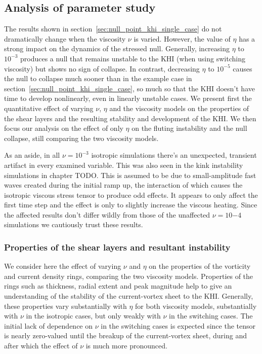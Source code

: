 
\subsection{Analysis of parameter study}

The results shown in section~\ref{sec:null_point_khi_single_case} do not dramatically change when the viscosity $\nu$ is varied. However, the value of $\eta$ has a strong impact on the dynamics of the stressed null. Generally, increasing $\eta$ to $10^{-3}$ produces a null that remains unstable to the KHI (when using switching viscosity) but shows no sign of collapse. In contrast, decreasing $\eta$ to $10^{-5}$ causes the null to collapse much sooner than in the example case in section~\ref{sec:null_point_khi_single_case}, so much so that the KHI doesn't have time to develop nonlinearly, even in linearly unstable cases. We present first the quantitative effect of varying $\nu$, $\eta$ and the viscosity models on the properties of the shear layers and the resulting stability and development of the KHI. We then focus our analysis on the effect of only $\eta$ on the fluting instability and the null collapse, still comparing the two viscosity models.

As an aside, in all $\nu = 10^{-3}$ isotropic simulations there's an unexpected, transient artifact in every examined variable. This was also seen in the kink instability simulations in chapter TODO. This is assumed to be due to small-amplitude fast waves created during the initial ramp up, the interaction of which causes the isotropic viscous stress tensor to produce odd effects. It appears to only affect the first time step and the effect is only to slightly increase the viscous heating. Since the affected results don't differ wildly from those of the unaffected $\nu=10{-4}$ simulations we cautiously trust these results.

\subsubsection{Properties of the shear layers and resultant instability}

We consider here the effect of varying $\nu$ and $\eta$ on the properties of the vorticity and current density rings, comparing the two viscosity models. Properties of the rings such as thickness, radial extent and peak magnitude help to give an understanding of the stability of the current-vortex sheet to the KHI. Generally, these properties vary substantially with $\eta$ for both viscosity models, substantially with $\nu$ in the isotropic cases, but only weakly with $\nu$ in the switching cases. The initial lack of dependence on $\nu$ in the switching cases is expected since the tensor is nearly zero-valued until the breakup of the current-vortex sheet, during and after which the effect of $\nu$ is much more pronounced.

